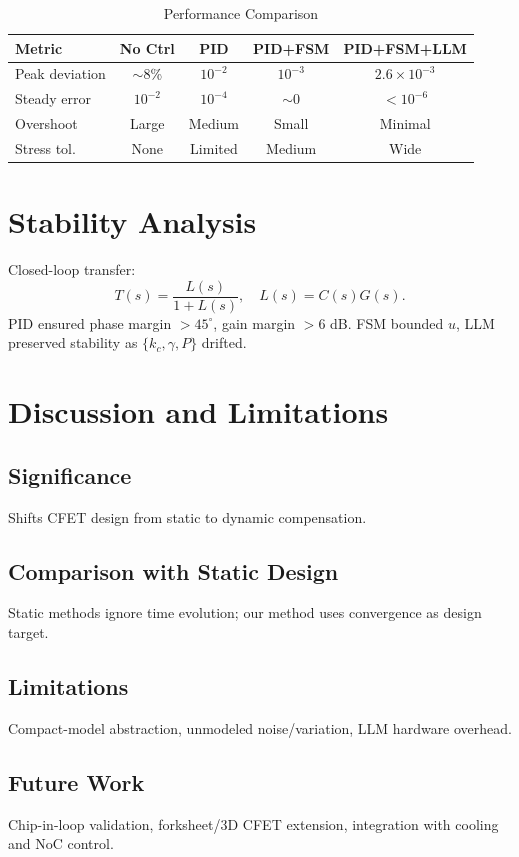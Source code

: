 \documentclass[conference]{IEEEtran}
\begin{document}
\begin{table}[h]
\renewcommand{\arraystretch}{1.1}
\caption{Performance Comparison}
\centering
\begin{tabular}{|l|c|c|c|c|}
\hline
Metric & No Ctrl & PID & PID+FSM & PID+FSM+LLM \\
\hline
Peak deviation & $\sim$8\% & $10^{-2}$ & $10^{-3}$ & $2.6\times 10^{-3}$ \\
Steady error   & $10^{-2}$ & $10^{-4}$ & $\sim$0 & $<10^{-6}$ \\
Overshoot      & Large     & Medium    & Small   & Minimal \\
Stress tol.    & None      & Limited   & Medium  & Wide \\
\hline
\end{tabular}
\end{table}

\section{Stability Analysis}
Closed-loop transfer:
\[
T(s) = \frac{L(s)}{1+L(s)}, \quad L(s)=C(s)G(s).
\]
PID ensured phase margin $>45^\circ$, gain margin $>6$ dB. FSM bounded $u$, LLM preserved stability as $\{k_c,\gamma,P\}$ drifted.

\section{Discussion and Limitations}
\subsection{Significance}
Shifts CFET design from static to dynamic compensation.  

\subsection{Comparison with Static Design}
Static methods ignore time evolution; our method uses convergence as design target.  

\subsection{Limitations}
Compact-model abstraction, unmodeled noise/variation, LLM hardware overhead.  

\subsection{Future Work}
Chip-in-loop validation, forksheet/3D CFET extension, integration with cooling and NoC control.  
\end{document}
